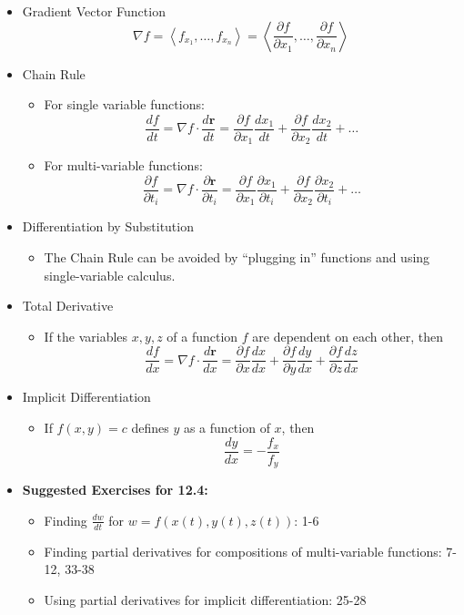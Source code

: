\documentclass[12pt]{article}
\newcommand{\ds}{\displaystyle}
\renewcommand{\vec}[1]{\mathbf{#1}}
\newcommand{\<}{\left<}
\renewcommand{\>}{\right>}
\begin{document}
\begin{itemize}

  \item Gradient Vector Function
    \[\nabla f = \< f_{x_1}, \dots, f_{x_n} \> = \<\frac{\partial f}{\partial x_1}, \dots, \frac{\partial f}{\partial x_n}\>\]
  
  \item Chain Rule
    \begin{itemize}
      \item For single variable functions:
        \[\frac{df}{dt}=\nabla{f}\cdot\frac{d\vec{r}}{dt}=\frac{\partial f}{\partial x_1}\frac{dx_1}{dt}+\frac{\partial f}{\partial x_2}\frac{dx_2}{dt}+\dots\]
      \item For multi-variable functions:
        \[\frac{\partial f}{\partial t_i}=\nabla{f}\cdot\frac{\partial\vec{r}}{\partial t_i}=\frac{\partial f}{\partial x_1}\frac{\partial x_1}{\partial t_i}+\frac{\partial f}{\partial x_2}\frac{\partial x_2}{\partial t_i}+\dots\]
    \end{itemize}
    
  \item Differentiation by Substitution
  
    \begin{itemize}
    \item The Chain Rule can be avoided by ``plugging in'' functions and using single-variable calculus.
    \end{itemize}

  \item Total Derivative
    \begin{itemize}
    \item If the variables $x,y,z$ of a function $f$ are dependent on each other, then
      \[
        \frac{df}{dx} = \nabla f \cdot \frac{d\vec{r}}{dx} = 
        \frac{\partial f}{\partial x}\frac{dx}{dx} + \frac{\partial f}{\partial y}\frac{dy}{dx} + \frac{\partial f}{\partial z}\frac{dz}{dx} 
      \]
    \end{itemize}
    
  \item Implicit Differentiation
    \begin{itemize}
    \item If $f(x,y)=c$ defines $y$ as a function of $x$, then
      \[\ds\frac{dy}{dx} = -\frac{f_x}{f_y}\]
    \end{itemize}
    
  \item \textbf{Suggested Exercises for 12.4:}
  
    \begin{itemize}
    \item Finding $\frac{dw}{dt}$ for $w=f(x(t),y(t),z(t))$: 1-6
    \item Finding partial derivatives for compositions of multi-variable functions: 7-12, 33-38
    \item Using partial derivatives for implicit differentiation: 25-28
    \end{itemize}

\end{itemize}
\end{document}
